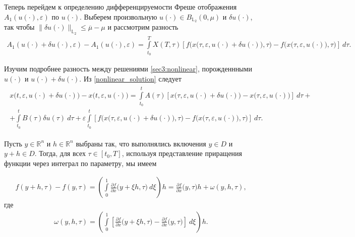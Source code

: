 \documentclass[../main.tex]{subfiles}
\begin{document}
Теперь перейдем к определению дифференцируемости Фреше отображения $A_1(u(\cdot),\varepsilon)$ по $u(\cdot)$.
Выберем произвольную $u(\cdot) \in B_{\mathbb{L}_2}(0,\mu)$ и $\delta u(\cdot)$, так чтобы $\|\delta u(\cdot)\|_{\mathbb{L}_2} \leqslant \overline{\mu}-\mu$ и рассмотрим разность
\begin{gather}\label{diff_A}
	A_1(u(\cdot) + \delta u(\cdot),\varepsilon) - A_1(u(\cdot) ,\varepsilon) = \int\limits_{t_0}^T X(T,\tau) \left[ 
	f\Big(x\big(\tau,\varepsilon, u(\cdot) + \delta u(\cdot)\big),\tau\Big) - 
	f\Big(x\big(\tau,\varepsilon, u(\cdot)\big),\tau\Big) \right]\ d\tau.
\end{gather}

Изучим подробнее разность между решениями \eqref{sec3:nonlinear}, порожденнными $u(\cdot)$ и $u(\cdot) + \delta u(\cdot)$. Из \eqref{nonlinear_solution} следует
\begin{gather}\label{diff_of_x}
	\begin{gathered}
		x\big(t,\varepsilon, u(\cdot) + \delta u(\cdot)\big) -
		x\big(t,\varepsilon, u(\cdot)\big) 
		= \int\limits_{t_0}^t A(\tau) \left[
		x\big(\tau,\varepsilon, u(\cdot) + \delta u(\cdot)\big) -
		x\big(\tau,\varepsilon, u(\cdot)\big) 
		\right]\ d\tau + \\ +
		\int\limits_{t_0}^t B(\tau) \delta u(\tau)\ d\tau +
		\varepsilon\int\limits_{t_0}^t \left[ 
		f\Big(x\big(\tau,\varepsilon, u(\cdot) + \delta u(\cdot)\big),\tau\Big) -
		f\Big(x\big(\tau,\varepsilon, u(\cdot)\big),\tau\Big)
		\right]\ d\tau.
	\end{gathered}
\end{gather}

Пусть $y \in \mathbb{R}^n$ и $h \in \mathbb{R}^n$ выбраны так, что выполнялись включения $y\in D$ и $y+h \in D$. Тогда, для всех $\tau \in [t_0,T]$, используя представление приращения функции через интеграл по параметру, мы имеем

\begin{gather*}
	f(y + h, \tau) - f(y,\tau) = 
	\left( \int\limits_{0}^{1} 
	\frac{\partial f}{\partial x}  \big(y + \xi h, \tau\big)\ d\xi \right) h =
	\frac{\partial f}{\partial x}  \big(y, \tau\big) h + \omega(y,h,\tau),
\end{gather*}
где 
\begin{gather*}
	\omega(y,h,\tau) = \left( \int\limits_{0}^{1} 
	\left[\frac{\partial f}{\partial x}  \big(y + \xi h, \tau\big) -
	\frac{\partial f}{\partial x}  \big(y, \tau\big) \right] \ d \xi \right) h.
\end{gather*}
\end{document}
